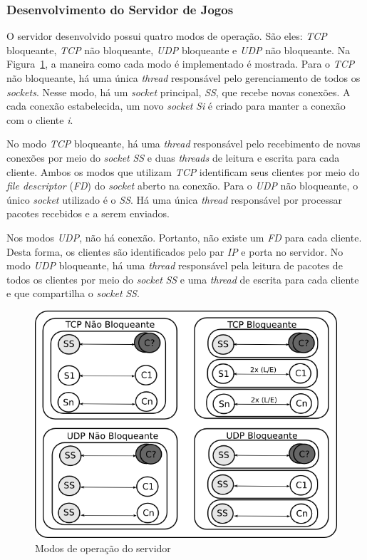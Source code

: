 \documentclass[12pt]{article}
\begin{document}
\subsubsection{Desenvolvimento do Servidor de Jogos}

O servidor desenvolvido possui quatro modos de operação. São eles: \emph{TCP}
bloqueante, \emph{TCP} não bloqueante, \emph{UDP} bloqueante e \emph{UDP} não
bloqueante. Na Figura~\ref{fig:server}, a maneira como cada modo é implementado
é mostrada. Para o \emph{TCP} não bloqueante, há uma única \emph{thread}
responsável pelo gerenciamento de todos os \emph{sockets}. Nesse modo, há um
\emph{socket} principal, \emph{SS}, que recebe novas conexões. A cada conexão
estabelecida, um novo \emph{socket} \emph{Si} é criado para manter a conexão
com o cliente \emph{i}.

No modo \emph{TCP} bloqueante, há uma \emph{thread} responsável pelo
recebimento de novas conexões por meio do \emph{socket} \emph{SS} e duas
\emph{threads} de leitura e escrita para cada cliente. Ambos os modos que
utilizam \emph{TCP} identificam seus clientes por meio do \emph{file
descriptor} (\emph{FD}) do \emph{socket} aberto na conexão. Para o \emph{UDP}
não bloqueante, o único \emph{socket} utilizado é o \emph{SS}. Há uma única
\emph{thread} responsável por processar pacotes recebidos e a serem enviados.

Nos modos \emph{UDP}, não há conexão. Portanto, não existe um \emph{FD} para
cada cliente. Desta forma, os clientes são identificados pelo par \emph{IP} e
porta no servidor. No modo \emph{UDP} bloqueante, há uma \emph{thread}
responsável pela leitura de pacotes de todos os clientes por meio do
\emph{socket} \emph{SS} e uma \emph{thread} de escrita para cada cliente e que
compartilha o \emph{socket} \emph{SS}. 

\begin{figure}[ht]
  \centering
  \includegraphics[width=.8\textwidth]{img/server.png}
  \caption{Modos de operação do servidor}
  \label{fig:server}
\end{figure}
\end{document}
